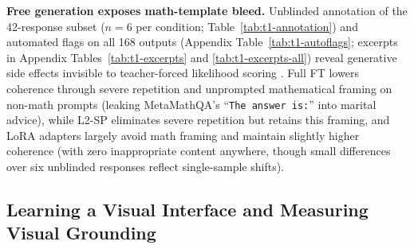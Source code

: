 \documentclass{article}
\begin{document}


\textbf{Free generation exposes math-template bleed.} Unblinded annotation of the 42-response subset ($n=6$ per condition; Table~\ref{tab:t1-annotation}) and automated flags on all 168 outputs (Appendix Table~\ref{tab:t1-autoflags}; excerpts in Appendix Tables~\ref{tab:t1-excerpts} and \ref{tab:t1-excerpts-all}) reveal generative side effects invisible to teacher-forced likelihood scoring \citep{betley2025emergent}. Full FT lowers coherence through severe repetition and unprompted mathematical framing on non-math prompts (leaking MetaMathQA's ``\texttt{The answer is:}'' into marital advice), while L2-SP eliminates severe repetition but retains this framing, and LoRA adapters largely avoid math framing and maintain slightly higher coherence (with zero inappropriate content anywhere, though small differences over six unblinded responses reflect single-sample shifts).

\subsection{Learning a Visual Interface and Measuring Visual Grounding}
\label{sec:results-vlm}
\end{document}
